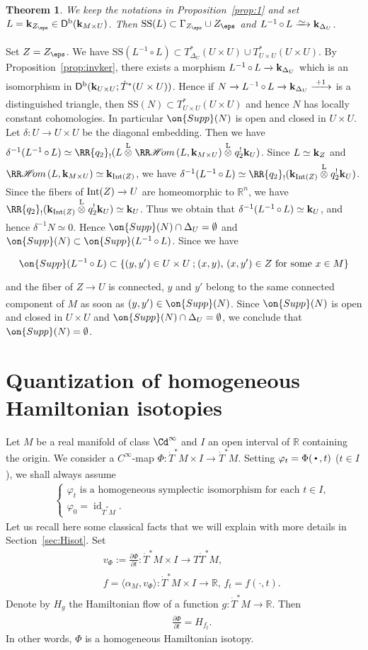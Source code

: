 \documentclass[12pt,leqno]{article}
\newtheorem{theorem}{Theorem}[section]
\theoremstyle{definition}
\newcommand{\R}{{\mathbb{R}}}
\def\phi{{\varphi}}
\newcommand{\cor}{{\bf k}}
\renewcommand{\to}[1][]{\xrightarrow[]{#1}}
\newcommand{\isoto}[1][]{\xrightarrow[#1]%
{{\raisebox{-.6ex}[0ex][-.6ex]{$\mspace{1mu}\sim\mspace{2mu}$}}}}
\newcommand{\rhom}[1][]{{\RR\mathscr{H}\mspace{-3mu}om}_{\raise1.5ex\hbox to.1em{}#1}}
\newcommand{\ltens}[1][]{\mathbin{\overset{\mathrm{L}}\otimes}_{#1}}
\newcommand{\conv}[1][]{\mathop{\circ}\limits_{#1}}
\newcommand{\reim}[1]{\RR{#1}_!}
\newcommand{\opb}[1]{#1^{-1}}
\newcommand{\epb}[1]{#1^{!}}
\newcommand{\eqdot}{\mathbin{:=}}
\newcommand{\cl}{\colon}
\newcommand{\scbul}{{\,\raise.4ex\hbox{$\scriptscriptstyle\bullet$}\,}}
\newcommand{\eq}{\begin{eqnarray}}
\newcommand{\eneq}{\end{eqnarray}}
\newcommand{\eqn}{\begin{eqnarray*}}
\newcommand{\eneqn}{\end{eqnarray*}}
\newcommand{\set}[2]{\left\{#1 \mathbin{;} #2 \right\}}
\DeclareMathOperator{\id}{id}
\newcommand{\Supp}{\on{Supp}}
\newcommand{\Der}[1][]{\mathsf{D}^{#1}}
\newcommand{\Derb}{\Der[\mathrm{b}]}
\newcommand{\SSi}{\mathrm{SS}}
\newcommand{\Int}{{\rm Int}}
\newcommand{\dT}{{\dot{T}}}
\newcommand{\dTM}{{\dT}^*M}
\numberwithin{equation}{section}
\begin{document}
\begin{theorem}\label{th:2}
We keep the notations in Proposition~\ref{prop:1}
and set $L=\cor_{Z_\eps}\in\Derb(\cor_{M\times U})$. Then
$\SSi(L)\subset \Gamma_{Z_\eps}\cup Z_\eps$ and $\opb{L}\conv L\isoto\cor_{\Delta_U}$. 
\end{theorem}
\Proof
Set $Z=Z_\eps$. We have
$\SSi(\opb{L}\conv L)\subset T^*_{\Delta_U}(U\times U)\cup T^*_{U\times U}(U\times U)$.
By Proposition~\ref{prop:invker}, there exists a morphism
$\opb{L}\conv L\to \cor_{\Delta_U}$ which is an isomorphism
in $\Derb(\cor_{U\times U};\dT^*(U\times U))$.
Hence if $N\to \opb{L}\conv L\to \cor_{\Delta_U}\to[\;+1\;]$
is a distinguished triangle, then
$\SSi(N)\subset T^*_{U\times U}(U\times U)$ and hence 
$N$ has locally constant cohomologies.
In particular $\Supp(N)$ is open and closed in $U\times U$.
Let $\delta\cl U\to U\times U$ be the diagonal embedding.
Then we have
$\opb{\delta}(\opb{L}\conv L)
\simeq \reim{q_2}(L\ltens\rhom(L,\cor_{M\times U})\ltens \epb{q_2}\cor_U)$.
Since $L\simeq\cor_Z$ and
$\rhom(L,\cor_{M\times U})\simeq\cor_{\Int(Z)}$, we have
$\opb{\delta}(\opb{L}\conv L)\simeq\reim{q_2}(\cor_{\Int(Z)}\ltens
\epb{q_2}\cor_U)$.
Since the fibers of $\Int(Z)\to U$ are homeomorphic to $\R^n$,
we have
$\reim{q_2}(\cor_{\Int(Z)}\ltens
\epb{q_2}\cor_U)\simeq\cor_U$.
Thus we obtain that $\opb{\delta}(\opb{L}\conv L)\simeq \cor_U$, and hence
$\opb{\delta}N\simeq 0$.
Hence $\Supp(N)\cap\Delta_U=\emptyset$ and
$\Supp(N)\subset\Supp(\opb{L}\conv L)$.
Since we have
$$\Supp(\opb{L}\conv L)
\subset \set{(y,y')\in U\times U}
{\text{$(x,y)$, $(x,y')\in Z$ for some $x\in M$}}$$
and the fiber of $Z\to U$ is connected,
$y$ and $y'$ belong to the same connected component of $M$ as soon as 
$(y,y')\in \Supp(N)$.
Since $\Supp(N)$ is open and closed in $U\times U$ 
and $\Supp(N)\cap\Delta_U=\emptyset$,
we conclude that $\Supp(N)=\emptyset$.
\QED


\section{Quantization of homogeneous Hamiltonian isotopies}
\label{section:qisot}
Let $M$ be a real manifold of class $\Cd^\infty$ and $I$ an open interval of
$\R$ containing the origin.  
We consider a $C^\infty$-map
$\Phi\cl \dTM\times I\to \dTM$. Setting  $\phi_t=\Phi(\scbul,t)$ ($t\in I$), 
we shall always  assume 
\eq\label{hyp:isot1}
&&\begin{cases}
\mbox{$\phi_t$ is a homogeneous symplectic isomorphism for each $t\in I$,} \\
\phi_0 = \id_{\dTM}.
\end{cases}
\eneq
Let us recall here some classical facts that we will explain with 
more details in Section~\ref{sec:Hisot}.
Set 
\eqn
&& v_\Phi \eqdot \frac{\partial\Phi}{\partial t} \cl \dTM\times I\to T\dTM,\\
&&f = \langle \alpha_M, v_\Phi \rangle \cl \dTM\times I\to \R,\,f_t=f(\cdot,t).
\eneqn
Denote by $H_g$ the Hamiltonian flow of a function $g\cl\dTM\to\R$.
Then
\eqn
&&\frac{\partial\Phi}{\partial t} =H_{f_t}.
\eneqn
In other words, $\Phi$ is a homogeneous Hamiltonian isotopy.
\end{document}

